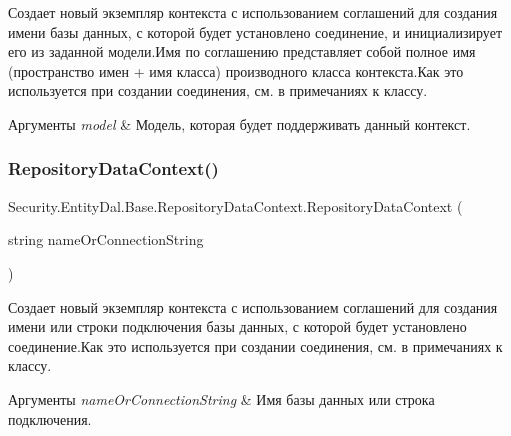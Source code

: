 Создает новый экземпляр контекста с использованием соглашений для создания имени базы данных, с которой будет установлено соединение, и инициализирует его из заданной модели.\+Имя по соглашению представляет собой полное имя (пространство имен + имя класса) производного класса контекста.\+Как это используется при создании соединения, см. в примечаниях к классу. 


\begin{DoxyParams}{Аргументы}
{\em model} & Модель, которая будет поддерживать данный контекст.\\
\hline
\end{DoxyParams}
\mbox{\label{class_security_1_1_entity_dal_1_1_base_1_1_repository_data_context_ae6e3c338a6998c7770cafedc4c6f4706}} 
\subsubsection{\texorpdfstring{Repository\+Data\+Context()}{RepositoryDataContext()}\hspace{0.1cm}{\footnotesize\ttfamily [3/7]}}
{\footnotesize\ttfamily Security.\+Entity\+Dal.\+Base.\+Repository\+Data\+Context.\+Repository\+Data\+Context (\begin{DoxyParamCaption}\item[{string}]{name\+Or\+Connection\+String }\end{DoxyParamCaption})\hspace{0.3cm}{\ttfamily [protected]}}



Создает новый экземпляр контекста с использованием соглашений для создания имени или строки подключения базы данных, с которой будет установлено соединение.\+Как это используется при создании соединения, см. в примечаниях к классу. 


\begin{DoxyParams}{Аргументы}
{\em name\+Or\+Connection\+String} & Имя базы данных или строка подключения.\\
\hline
\end{DoxyParams}
\mbox{\label{class_security_1_1_entity_dal_1_1_base_1_1_repository_data_context_ac7983fdf9c6abc654fb960466636a1c2}} 
